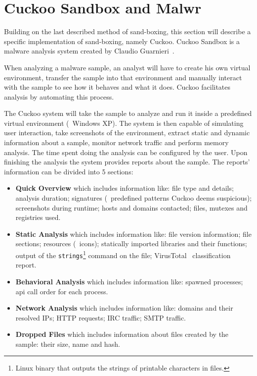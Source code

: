 \section{Cuckoo Sandbox and Malwr}
\label{section:cuckoo}

Building on the last described method of sand-boxing, this section will describe a specific implementation of sand-boxing, namely Cuckoo.
Cuckoo Sandbox is a malware analysis system created by Claudio Guarnieri~\cite{tool:cuckoo}.

When analyzing a malware sample, an analyst will have to create his own virtual environment, transfer the sample into that environment and manually interact with the sample to see how it behaves and what it does.
Cuckoo facilitates analysis by automating this process.

The Cuckoo system will take the sample to analyze and run it inside a predefined virtual environment (\eg\ Windows XP).
The system is then capable of simulating user interaction, take screenshots of the environment, extract static and dynamic information about a sample, monitor network traffic and perform memory analysis.
The time spent doing the analysis can be configured by the user.
Upon finishing the analysis the system provides reports about the sample. The reports' information can be divided into 5 sections:
\begin{itemize}
	\item \textbf{Quick Overview} which includes information like: file type and details; analysis duration; signatures (\ie\ predefined patterns Cuckoo deems suspicious); screenshots during runtime; hosts and domains contacted; files, mutexes and registries used.
	\item \textbf{Static Analysis} which includes information like: file version information; file sections; resources (\eg\ icons); statically imported libraries and their functions; output of the \texttt{strings}\footnote{Linux binary that outputs the strings of printable characters in files.} command on the file; VirusTotal~\cite{tool:virustotal} classification report.
	\item \textbf{Behavioral Analysis} which includes information like: spawned processes; \gls{api} call order for each process.
	\item \textbf{Network Analysis} which includes information like: domains and their resolved IPs; HTTP requests; IRC traffic; SMTP traffic.
	\item \textbf{Dropped Files} which includes information about files created by the sample: their size, name and hash.
\end{itemize}

